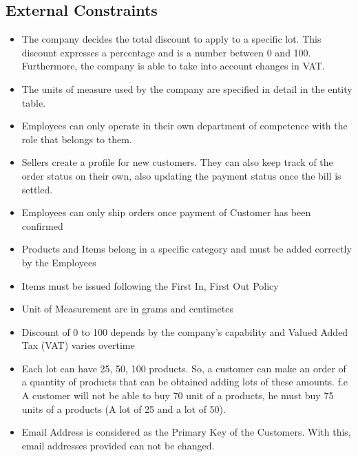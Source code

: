\subsection{External Constraints}
\begin{itemize}
\item The company decides the total discount to apply to a specific lot. This discount expresses a percentage and is a number between 0 and 100. Furthermore, the company is able to take into account changes in VAT.
\item The units of measure used by the company are specified in detail in the entity table.
\item Employees can only operate in their own department of competence with the role that belongs to them.
\item Sellers create a profile for new customers. They can also keep track of the order status on their own, also updating the payment status once the bill is settled.
\item Employees can only ship orders once payment of Customer has been confirmed
\item Products and Items belong in a specific category and must be added correctly by the Employees
\item Items must be issued following the First In, First Out Policy
\item Unit of Measurement are in grams and centimetes
\item Discount of 0 to 100 depends by the company's capability and Valued Added Tax (VAT) varies overtime
\item Each lot can have 25, 50, 100 products. So, a customer can make an order of a quantity of products that can be obtained adding lots of these amounts. f.e A customer will not be able to buy 70 unit of a products, he must buy 75 units of a products (A lot of 25 and a lot of 50).
\item Email Address is considered as the Primary Key of the Customers. With this, email addresses provided can not be changed.
\end{itemize}